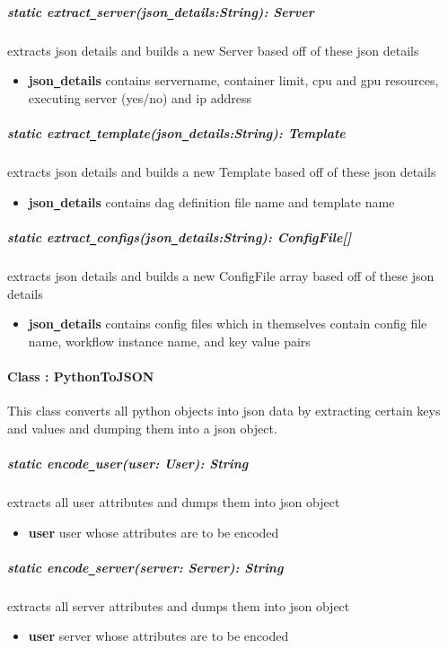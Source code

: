 \subparagraph{static extract\texttt{\_}server(json\texttt{\_}details:String): Server}
extracts json details and builds a new Server based off of these json details
\begin{itemize}
        \item \textbf{json\texttt{\_}details}
        contains servername, container limit, cpu and gpu resources, executing server (yes/no) and ip address
\end{itemize}

\subparagraph{static extract\texttt{\_}template(json\texttt{\_}details:String): Template}
extracts json details and builds a new Template based off of these json details
\begin{itemize}
        \item \textbf{json\texttt{\_}details}
        contains dag definition file name and template name
\end{itemize}

\subparagraph{static extract\texttt{\_}configs(json\texttt{\_}details:String): ConfigFile[]}
extracts json details and builds a new ConfigFile array based off of these json details
\begin{itemize}
        \item \textbf{json\texttt{\_}details}
        contains config files which in themselves contain config file name, workflow instance name,
        and key value pairs
\end{itemize}

\paragraph{Class : PythonToJSON}
This class converts all python objects into json data by extracting certain keys and values and dumping
them into a json object.

\subparagraph{static encode\texttt{\_}user(user: User): String}
extracts all user attributes and dumps them into json object
\begin{itemize}
        \item \textbf{user}
        user whose attributes are to be encoded
\end{itemize}

\subparagraph{static encode\texttt{\_}server(server: Server): String}
extracts all server attributes and dumps them into json object
\begin{itemize}
        \item \textbf{user}
        server whose attributes are to be encoded
\end{itemize}


